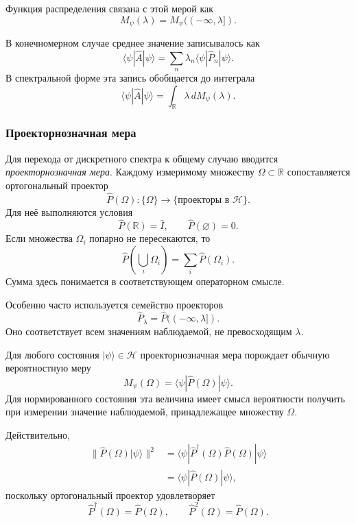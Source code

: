 \documentclass[12pt,a4paper]{article}
\begin{document}
Функция распределения связана с этой мерой как
\[
    M_\psi(\lambda)
    =
    M_\psi((-\infty,\lambda]).
\]

В конечномерном случае среднее значение записывалось как
\[
    \langle\psi|\hat A|\psi\rangle
    =
    \sum_n
        \lambda_n
        \langle\psi|\hat P_n|\psi\rangle.
\]
В спектральной форме эта запись обобщается до интеграла
\[
    \boxed{
    \langle\psi|\hat A|\psi\rangle
    =
    \int_{\mathbb R}
        \lambda\,dM_\psi(\lambda)
    }.
\]

\subsubsection{Проекторнозначная мера}

Для перехода от дискретного спектра к общему случаю вводится
\emph{проекторнозначная мера}. Каждому измеримому множеству
$\Omega\subset\mathbb R$ сопоставляется ортогональный проектор
\[
    \boxed{
        \hat P(\Omega):\{\Omega\}\longrightarrow
        \{\text{проекторы в }\mathcal H\}
    }.
\]
Для неё выполняются условия
\[
    \boxed{
        \hat P(\mathbb R)=\hat I,
        \qquad
        \hat P(\varnothing)=0
    }.
\]
Если множества $\Omega_i$ попарно не пересекаются, то
\[
    \boxed{
        \hat P\left(\bigcup_i\Omega_i\right)
        =
        \sum_i\hat P(\Omega_i)
    }.
\]
Сумма здесь понимается в соответствующем операторном смысле.

Особенно часто используется семейство проекторов
\[
    \boxed{
        \hat P_\lambda
        =
        \hat P((-\infty,\lambda])
    }.
\]
Оно соответствует всем значениям наблюдаемой, не превосходящим
$\lambda$.

Для любого состояния $|\psi\rangle\in\mathcal H$ проекторнозначная
мера порождает обычную вероятностную меру
\[
    \boxed{
        M_\psi(\Omega)
        =
        \langle\psi|\hat P(\Omega)|\psi\rangle
    }.
\]
Для нормированного состояния эта величина имеет смысл вероятности
получить при измерении значение наблюдаемой, принадлежащее множеству
$\Omega$.

Действительно,
\[
\begin{aligned}
    \|\hat P(\Omega)|\psi\rangle\|^2
    &=
    \langle\psi|
        \hat P^\dagger(\Omega)\hat P(\Omega)
    |\psi\rangle \\
    &=
    \langle\psi|\hat P(\Omega)|\psi\rangle,
\end{aligned}
\]
поскольку ортогональный проектор удовлетворяет
\[
    \hat P^\dagger(\Omega)=\hat P(\Omega),
    \qquad
    \hat P^2(\Omega)=\hat P(\Omega).
\]
\end{document}
